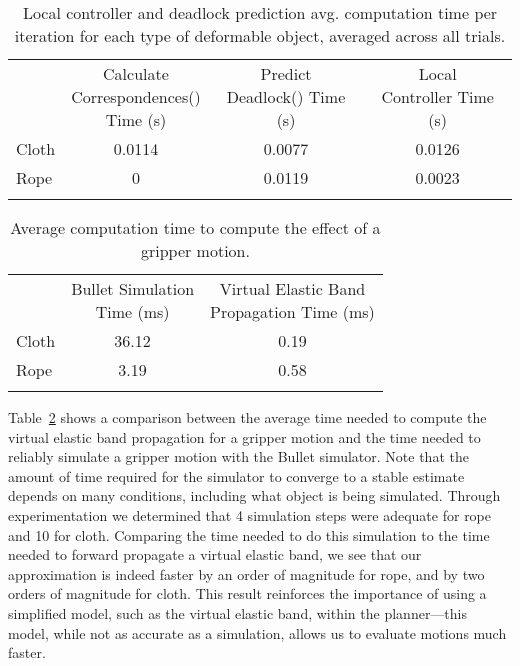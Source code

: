 \begin{table}[ht]
\centering
\caption{Local controller and deadlock prediction avg. computation time per iteration for each type of deformable object, averaged across all trials.}
\label{tab:control_statistics}
\begin{tabular}{lccc}
\noalign{\smallskip}\hline\noalign{\smallskip}
& 
\parbox{1.3in}{\centering Calculate\\Correspondences()\\Time (s)} &
\parbox{0.8in}{\centering Predict\\Deadlock() Time (s)} &
\parbox{0.8in}{\centering Local\\Controller Time (s)} \\
\noalign{\smallskip}\hline\noalign{\smallskip}
Cloth   & 0.0114 & 0.0077 & 0.0126 \\
Rope    & 0      & 0.0119 & 0.0023 \\
\noalign{\smallskip}\hline
\end{tabular}
\end{table}

\begin{table}[ht]
\centering
\caption{Average computation time to compute the effect of a gripper motion.}
\label{tab:prediction_statistics}
\begin{tabular}{lcc}
\noalign{\smallskip}\hline\noalign{\smallskip}
& 
\parbox{1.7in}{\centering Bullet Simulation\\Time (ms)} &
\parbox{2in}{\centering Virtual Elastic Band \\ Propagation Time (ms)} \\
\noalign{\smallskip}\hline\noalign{\smallskip}
Cloth   & 36.12 & 0.19 \\
Rope    &  3.19 & 0.58 \\
\noalign{\smallskip}\hline
\end{tabular}
\end{table}


Table~\ref{tab:prediction_statistics} shows a comparison between the average time needed to compute the virtual elastic band propagation for a gripper motion and the time needed to reliably simulate a gripper motion with the Bullet simulator. Note that the amount of time required for the simulator to converge to a stable estimate depends on many conditions, including what object is being simulated. Through experimentation we determined that 4 simulation steps were adequate for rope and 10 for cloth. Comparing the time needed to do this simulation to the time needed to forward propagate a virtual elastic band, we see that our approximation is indeed faster by an order of magnitude for rope, and by two orders of magnitude for cloth. This result reinforces the importance of using a simplified model, such as the virtual elastic band, within the planner---this model, while not as accurate as a simulation, allows us to evaluate motions much faster.




